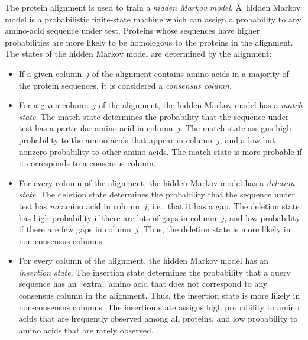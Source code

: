 \documentclass[preprint,nonatbib,blockstyle,nocopyrightspace,times]{sigplanconf}
\begin{document}
The protein alignment is used to train a \emph{hidden Markov model}.
A~hidden Markov model is a probabilistic finite-state machine which 
can assign a probability to any amino-acid sequence under test.
Proteins whose sequences have higher probabilities are more likely to
be homologous to the proteins in the alignment.
The states of the hidden Markov model are determined by the alignment:
\begin{itemize}
\item
If a given column~$j$ of the alignment contains amino acids in a majority
of the protein sequences, it is considered a \textit{consensus column}.
\item
For a given column~$j$ of the alignment, the hidden Markov model has a
\emph{match state}.
The match state determines the probability that the sequence under
test has a particular amino acid in column~$j$.
The match state assigns high probability to the amino acids that
appear in column~$j$, and a low but nonzero probability to other amino
acids.
The match state is more probable if it corresponds to a consensus column.
\item
For every column of the alignment, the hidden Markov model has a
\emph{deletion state}.
The deletion state determines the probability that the sequence under
test has \emph{no} amino acid  in column~$j$, i.e., that it has a gap.
The deletion state has high probability if there are lots of gaps in
column~$j$, and low probability if there are few gaps in column~$j$.
Thus, the deletion state is more likely in non-consensus columns.
\item
For every column of the alignment, the hidden Markov model has an
\emph{insertion state}.
The insertion state determines the probability that a query sequence
has an ``extra'' amino acid that does not correspond to any
consensus column in the alignment.
Thus, the insertion state is more likely in non-consensus columns.
The insertion state assigns high probability to amino acids that are
frequently observed among all proteins, and low probability to amino acids
that are rarely observed.
\end{itemize}
\end{document}
